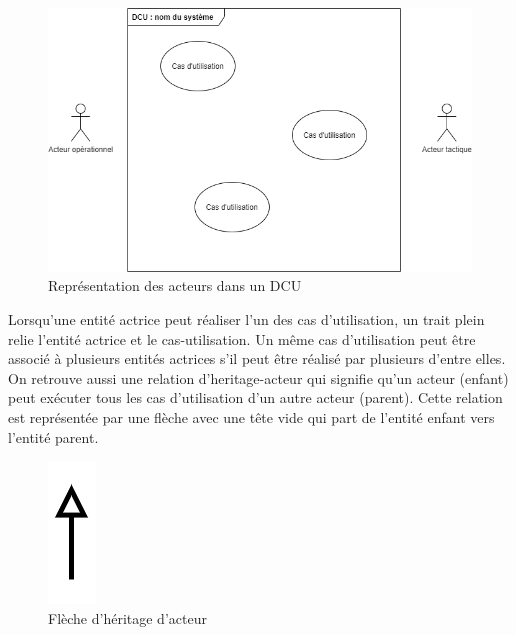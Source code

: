 \begin{figure}[H]
	\caption{Représentation des acteurs dans un \acrshort{DCU}} 
	\centering
	\includegraphics[width=.85\textwidth]{cas-utilisation2.png}
\end{figure}

Lorsqu'une entité actrice peut réaliser l'un des cas d'utilisation, un trait plein relie l'entité actrice et le \gls{cas-utilisation}. Un même cas d'utilisation peut être associé à plusieurs entités actrices s'il peut être réalisé par plusieurs d'entre elles. \\

On retrouve aussi une relation d'\gls{heritage-acteur}  qui signifie qu'un acteur (enfant) peut exécuter tous les cas d'utilisation d'un autre acteur (parent). Cette relation est représentée par une flèche avec une tête vide qui part de l'entité enfant vers l'entité parent.

\begin{figure}[H]
	\caption{Flèche d'héritage d'acteur}
	\centering
	\includegraphics[scale=0.4]{fleche-heritage.png}
\end{figure}

